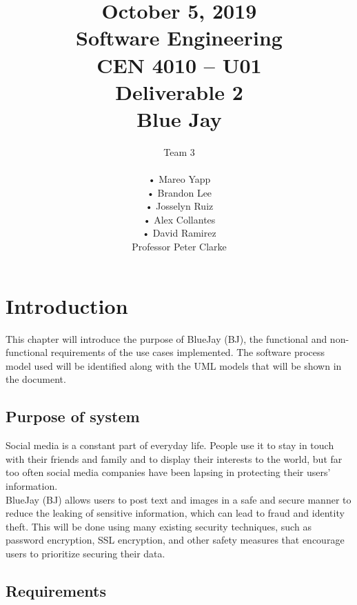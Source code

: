 \documentclass{report}
\begin{document}
\title{October 5, 2019\\
Software Engineering\\
CEN 4010 – U01\\
Deliverable 2\\
Blue Jay}

\author{Team 3\\
\\•	Mareo Yapp
\\•	Brandon Lee
\\•	Josselyn Ruiz
\\•	Alex Collantes
\\•	David Ramirez
\\Professor Peter Clarke}
\maketitle

\begin{abstract}

\end{abstract}
 
\tableofcontents

\chapter{Introduction}
	This chapter will introduce the purpose of BlueJay (BJ), the functional and non-functional requirements of the use cases implemented. The software process model used will be identified along with the UML models that will be shown in the document.
\section{Purpose of system}
	Social media is a constant part of everyday life. People use it to stay in touch with their friends and family and to display their interests to the world, but far too often social media companies have been lapsing in protecting their users’ information.\\
	BlueJay (BJ) allows users to post text and images in a safe and secure manner to reduce the leaking of sensitive information, which can lead to fraud and identity theft. This will be done using many existing security techniques, such as password encryption, SSL encryption, and other safety measures that encourage users to prioritize securing their data.
\section{Requirements}
\end{document}
